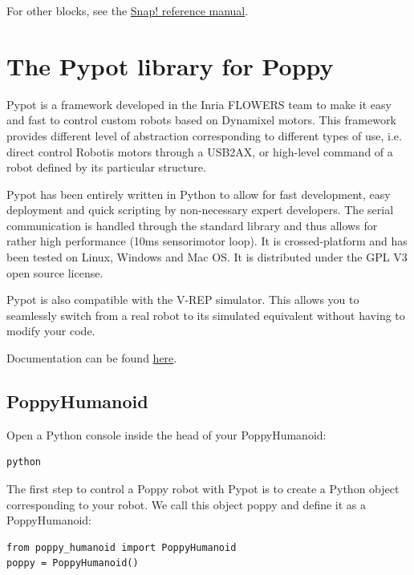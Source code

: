 \documentclass{article}
\begin{document}
For other blocks, see the \href{http://snap.berkeley.edu/SnapManual.pdf}{Snap! reference manual}.


\section{The Pypot library for Poppy}
\label{pypot}

Pypot is a framework developed in the Inria FLOWERS team to make it easy and fast to control custom robots based on Dynamixel motors. This framework provides different level of abstraction corresponding to different types of use, i.e. direct control Robotis motors through a USB2AX, or high-level command of a robot defined by its particular structure.

Pypot has been entirely written in Python to allow for fast development, easy deployment and quick scripting by non-necessary expert developers. The serial communication is handled through the standard library and thus allows for rather high performance (10ms sensorimotor loop). It is crossed-platform and has been tested on Linux, Windows and Mac OS. It is distributed under the GPL V3 open source license.

Pypot is also compatible with the V-REP simulator. This allows you to seamlessly switch from a real robot to its simulated equivalent without having to modify your code.

Documentation can be found \href{http://poppy-project.github.io/pypot/index.html}{here}. %

\subsection{PoppyHumanoid}

Open a Python console inside the head of your PoppyHumanoid:

\begin{verbatim}
python
\end{verbatim}

The first step to control a Poppy robot with Pypot is to create a Python object corresponding to your robot. We call this object poppy and define it as a PoppyHumanoid:

\begin{verbatim}
from poppy_humanoid import PoppyHumanoid
poppy = PoppyHumanoid()
\end{verbatim}
\end{document}
